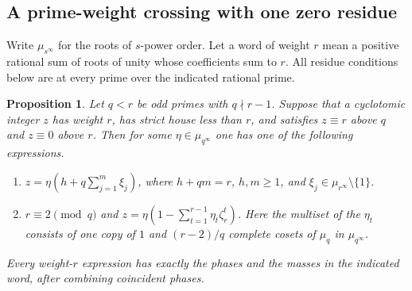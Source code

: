 \documentclass[11pt,a4paper]{article}
\numberwithin{equation}{section}
\newtheorem{proposition}[theorem]{Proposition}
\theoremstyle{remark}
\begin{document}
\subsection{A prime-weight crossing with one zero residue}\label{found:C:5}
Write $\mu_{s^\infty}$ for the roots of $s$-power order. Let a word of
weight $r$ mean a positive rational sum of roots of unity whose coefficients
sum to $r$. All residue conditions below are at every prime over the
indicated rational prime.
\begin{proposition}\label{found:C:5.1}\label{found:C:key:new:zero}
Let $q<r$ be odd primes with $q\nmid r-1$. Suppose that a cyclotomic
integer $z$ has weight $r$, has strict house less than $r$, and satisfies
$z\equiv r$ above $q$ and $z\equiv0$ above $r$. Then for some
$\eta\in\mu_{q^\infty}$ one has one of the following expressions.
\begin{enumerate}
\item $z=\eta(h+q\sum_{j=1}^m\xi_j)$, where $h+qm=r$,
$h,m\ge1$, and $\xi_j\in\mu_{r^\infty}\setminus\{1\}$.
\item $r\equiv2\pmod q$ and
$z=\eta(1-\sum_{t=1}^{r-1}\eta_t\zeta_r^t)$.
Here the multiset of the $\eta_t$ consists of one copy of $1$ and
$(r-2)/q$ complete cosets of $\mu_q$ in $\mu_{q^\infty}$.
\end{enumerate}
Every weight-$r$ expression has exactly the phases and the masses in
the indicated word, after combining coincident phases.
\end{proposition}
\end{document}
